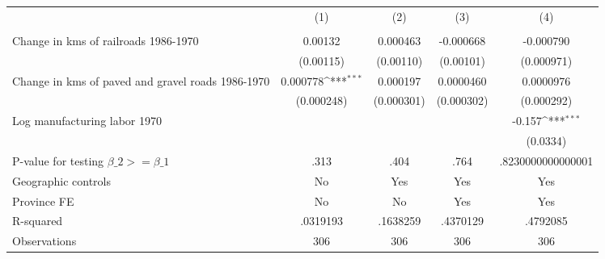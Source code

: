 {
\def\sym#1{\ifmmode^{#1}\else\(^{#1}\)\fi}
\begin{tabular}{l*{4}{c}}
\hline\hline
                &\multicolumn{1}{c}{(1)}&\multicolumn{1}{c}{(2)}&\multicolumn{1}{c}{(3)}&\multicolumn{1}{c}{(4)}\\
                &\multicolumn{1}{c}{}&\multicolumn{1}{c}{}&\multicolumn{1}{c}{}&\multicolumn{1}{c}{}\\
\hline
Change in kms of railroads 1986-1970&  0.00132         & 0.000463         &-0.000668         &-0.000790         \\
                &(0.00115)         &(0.00110)         &(0.00101)         &(0.000971)         \\
[1em]
Change in kms of paved and gravel roads 1986-1970& 0.000778\sym{***}& 0.000197         &0.0000460         &0.0000976         \\
                &(0.000248)         &(0.000301)         &(0.000302)         &(0.000292)         \\
[1em]
Log manufacturing labor 1970&                  &                  &                  &   -0.157\sym{***}\\
                &                  &                  &                  & (0.0334)         \\
\hline
P-value for testing $\beta\_{2} >= \beta\_{1}$&     .313         &     .404         &     .764         &.8230000000000001         \\
Geographic controls&       No         &      Yes         &      Yes         &      Yes         \\
Province FE     &       No         &       No         &      Yes         &      Yes         \\
R-squared       & .0319193         & .1638259         & .4370129         & .4792085         \\
Observations    &      306         &      306         &      306         &      306         \\
\hline\hline
\end{tabular}
}
